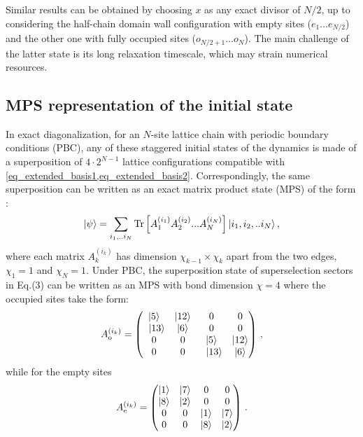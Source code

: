 \documentclass[aps,prl,reprint,twocolumn,superscriptaddress,floatfix,nofootinbib]{revtex4-2}
\begin{document}
Similar results can be obtained by choosing $x$ as any exact divisor of $N/2$, up to considering the half-chain domain wall configuration with empty sites ($e_{1} \dots e_{N/2}$) and the other one with fully occupied sites ($o_{N/2+1} \dots o_{N}$).
The main challenge of the latter state is its long relaxation timescale, which may strain numerical resources.

\subsection{MPS representation of the initial state}
In exact diagonalization, for an $N$-site lattice chain with periodic boundary conditions (PBC), any of these staggered initial states of the dynamics is made of a superposition of $4\cdot 2^{N-1}$ lattice configurations compatible with \cref{eq_extended_basis1,eq_extended_basis2}.
Correspondingly, the same superposition can be written as an exact matrix product state (MPS) of the form \cite{Fannes1992FinitelyCorrelatedStates, Klumper1991EquivalenceSolutionAnisotropic, Klumper1993MatrixProductGround}:
\begin{equation}
    \ket{\psi}=\sum_{i_1,..i_N} \mathrm{Tr} \left [ A^{(i_1)}_{1} A^{(i_2)}_{2}...A^{(i_N)}_{N} \right ] \ket{i_1,i_2,..i_N},
\end{equation}
where each matrix $A^{(i_{k})}_{k}$ has dimension $\chi_{k-1}{\times}\chi_{k}$ apart from the two edges, $\chi_{1}=1$ and $\chi_{N}=1$.
Under PBC, the superposition state of superselection sectors in Eq.(3) can be written as an MPS with bond dimension $\chi=4$ where the occupied sites take the form:
\begin{equation}
    A^{(i_{k})}_{\rm o}=\begin{pmatrix}
        \ket{5}      & \ket{12} & 0            & 0        \\
        \;\;\ket{13} & \ket{6}  & 0            & 0        \\
        0            & 0        & \ket{5}      & \ket{12} \\
        0            & 0        & \;\;\ket{13} & \ket{6}
    \end{pmatrix}\,,
\end{equation}
while for the empty sites
\begin{equation}
    A^{(i_{k})}_{\rm e}=\begin{pmatrix}
        \ket{1} & \ket{7} & 0       & 0       \\
        \ket{8} & \ket{2} & 0       & 0       \\
        0       & 0       & \ket{1} & \ket{7} \\
        0       & 0       & \ket{8} & \ket{2}
    \end{pmatrix}\,.
\end{equation}
\end{document}
